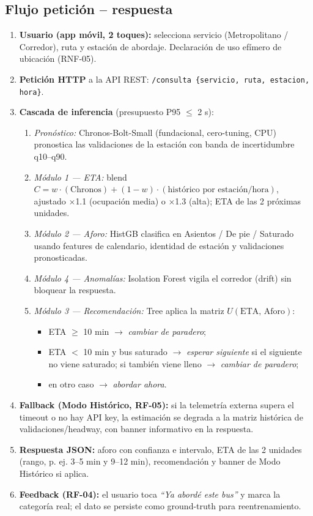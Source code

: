 \documentclass[11pt]{article}
\newcommand{\code}[1]{\texttt{#1}}
\begin{document}
\subsection{Flujo petición -- respuesta}
\begin{enumerate}
  \item \textbf{Usuario (app móvil, 2 toques):} selecciona servicio (Metropolitano / Corredor),
        ruta y estación de abordaje. Declaración de uso efímero de ubicación (RNF-05).
  \item \textbf{Petición HTTP} a la API REST: \code{/consulta \{servicio, ruta, estacion, hora\}}.
  \item \textbf{Cascada de inferencia} (presupuesto P95 $\leq$ 2 s):
        \begin{enumerate}
          \item \emph{Pronóstico:} Chronos-Bolt-Small (fundacional, cero-tuning, CPU) pronostica las
                validaciones de la estación con banda de incertidumbre q10--q90.
          \item \emph{Módulo 1 --- ETA:} blend $C = w\cdot(\text{Chronos}) +
                (1-w)\cdot(\text{histórico por estación/hora})$, ajustado $\times$1.1 (ocupación media)
                o $\times$1.3 (alta); ETA de las 2 próximas unidades.
          \item \emph{Módulo 2 --- Aforo:} HistGB clasifica en Asientos / De pie / Saturado usando
                features de calendario, identidad de estación y validaciones pronosticadas.
          \item \emph{Módulo 4 --- Anomalías:} Isolation Forest vigila el corredor (drift) sin bloquear
                la respuesta.
          \item \emph{Módulo 3 --- Recomendación:} Tree aplica la matriz $U(\text{ETA},\,\text{Aforo})$:
                \begin{itemize}
                  \item ETA $\geq$ 10 min $\rightarrow$ \textit{cambiar de paradero};
                  \item ETA $<$ 10 min y bus saturado $\rightarrow$ \textit{esperar siguiente} si el
                  siguiente no viene saturado; si también viene lleno $\rightarrow$ \textit{cambiar de paradero};
                  \item en otro caso $\rightarrow$ \textit{abordar ahora}.
                \end{itemize}
        \end{enumerate}
  \item \textbf{Fallback (Modo Histórico, RF-05):} si la telemetría externa supera el timeout o no
        hay API key, la estimación se degrada a la matriz histórica de validaciones/headway, con banner
        informativo en la respuesta.
  \item \textbf{Respuesta JSON:} aforo con confianza e intervalo, ETA de las 2 unidades (rango, p. ej.
        3--5 min y 9--12 min), recomendación y banner de Modo Histórico si aplica.
  \item \textbf{Feedback (RF-04):} el usuario toca \emph{``Ya abordé este bus''} y marca la categoría
        real; el dato se persiste como ground-truth para reentrenamiento.
\end{enumerate}
\end{document}
